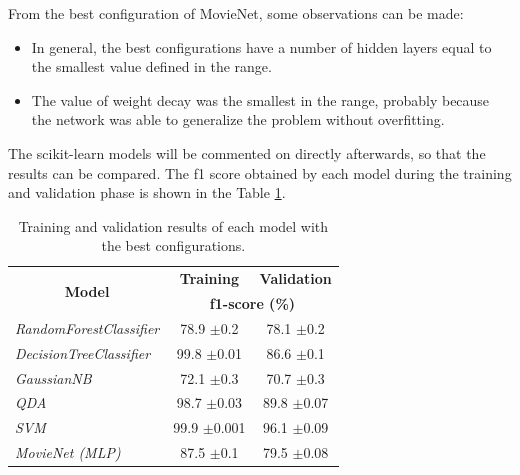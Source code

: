 \documentclass[../main]{subfiles}
\begin{document}
From the best configuration of MovieNet, some observations can be made:
\begin{itemize}
    \item In general, the best configurations have a number of hidden layers equal to the smallest value defined in the range.
    \item The value of weight decay was the smallest in the range, probably because the network was able to generalize the problem without overfitting.
\end{itemize}
The scikit-learn models will be commented on directly afterwards, so that the results can be compared.
The f1 score obtained by each model during the training and validation phase is shown in the Table \ref{table:train_val_results}.


\begin{table}[!ht]
    \center
    \begin{tabular}{|l|cc|}
        \hline
        \multicolumn{1}{|c|}{\multirow{2}{*}{\textbf{Model}}} & \multicolumn{1}{c|}{\textbf{Training}} & \multicolumn{1}{l|}{\textbf{Validation}} \\
        \cline{2-3} 
        \multicolumn{1}{|c|}{}                                & \multicolumn{2}{c|}{\textbf{f1-score (\%)}}                                       \\
        \hline
        \textit{RandomForestClassifier}                       & \multicolumn{1}{c|}{78.9 $\pm$0.2}         & 78.1 $\pm$0.2                                \\
        \hline
        \textit{DecisionTreeClassifier}                       & \multicolumn{1}{c|}{99.8 $\pm$0.01}        & 86.6 $\pm$0.1                                \\
        \hline
        \textit{GaussianNB}                                   & \multicolumn{1}{c|}{72.1 $\pm$0.3}         & 70.7 $\pm$0.3                                \\
        \hline
        \textit{QDA}                                          & \multicolumn{1}{c|}{98.7 $\pm$0.03}        & 89.8 $\pm$0.07                               \\
        \hline
        \textit{SVM}                                          & \multicolumn{1}{c|}{99.9 $\pm$0.001}       & 96.1 $\pm$0.09                               \\
        \hline
        \textit{MovieNet (MLP)}                               & \multicolumn{1}{c|}{87.5 $\pm$0.1}         & 79.5 $\pm$0.08                               \\
        \hline
    \end{tabular}
    \caption{Training and validation results of each model with the best configurations.}
    \label{table:train_val_results}
\end{table}
\end{document}

